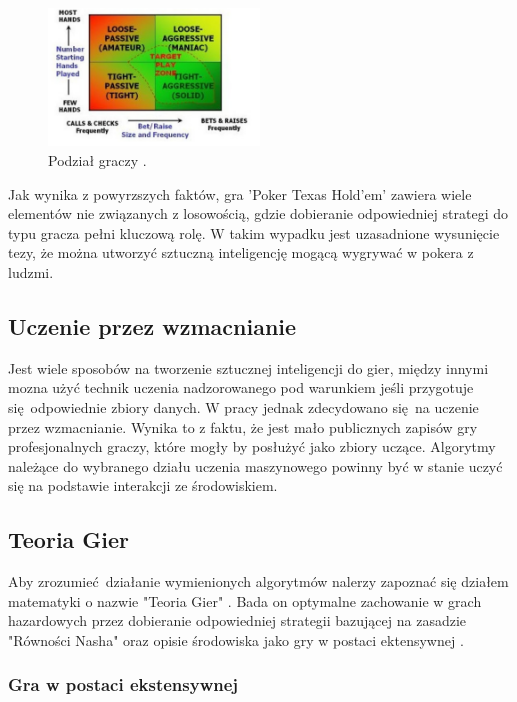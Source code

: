 \documentclass[12pt,oneside,a4paper]{report}
\begin{document}
\begin{figure}[h!]
            \center
           \includegraphics[width=0.5\textwidth]{./img/class.pdf}
           \caption{Podział graczy \cite{class}.}
\end{figure}


Jak wynika z powyrzszych faktów, gra 'Poker Texas Hold'em' zawiera wiele elementów nie związanych z
losowością, gdzie dobieranie odpowiedniej strategi do typu gracza pełni kluczową rolę. W takim
wypadku jest uzasadnione wysunięcie tezy, że można utworzyć sztuczną inteligencję mogącą wygrywać w
pokera z ludzmi.

\subsection{Uczenie przez wzmacnianie}

Jest wiele sposobów na tworzenie sztucznej inteligencji do gier, między innymi mozna użyć technik uczenia
nadzorowanego pod warunkiem jeśli przygotuje się odpowiednie zbiory danych. W pracy jednak
zdecydowano się na uczenie przez wzmacnianie. Wynika to z faktu, że jest mało publicznych zapisów
gry profesjonalnych graczy, które mogły by posłużyć jako zbiory uczące. Algorytmy należące do
wybranego działu uczenia maszynowego powinny być w stanie uczyć się na podstawie interakcji ze
środowiskiem.  


\subsection{Teoria Gier}

Aby zrozumieć działanie wymienionych algorytmów nalerzy zapoznać się
działem matematyki o nazwie "Teoria Gier" . Bada on optymalne zachowanie w grach
hazardowych przez dobieranie odpowiedniej strategii bazującej na zasadzie "Równości Nasha" oraz 
opisie środowiska jako gry w postaci ektensywnej \cite{gt}.

\subsubsection{Gra w postaci ekstensywnej}
\end{document}
